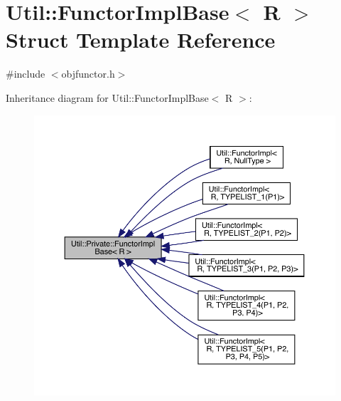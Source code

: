 \hypertarget{structUtil_1_1Private_1_1FunctorImplBase}{}\section{Util\+:\+:Functor\+Impl\+Base$<$ R $>$ Struct Template Reference}
\label{structUtil_1_1Private_1_1FunctorImplBase}


{\ttfamily \#include $<$objfunctor.\+h$>$}



Inheritance diagram for Util\+:\+:Functor\+Impl\+Base$<$ R $>$\+:\nopagebreak
\begin{figure}[H]
\begin{center}
\leavevmode
\includegraphics[width=350pt]{d1/da4/structUtil_1_1Private_1_1FunctorImplBase__inherit__graph}
\end{center}
\end{figure}
